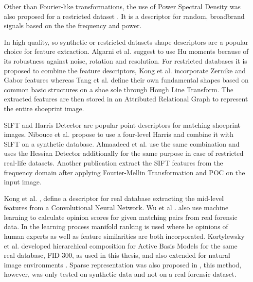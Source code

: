 \documentclass[draft,final]{vutinfth} %
\begin{document}
Other than Fourier-like transformations, the use of Power Spectral Density was also proposed for a restricted dataset \cite{dardi2009texture}.
It is a descriptor for random, broadbrand signals based on the the frequency and power.
\par
In high quality, so synthetic or restricted datasets shape descriptors are a popular choice for feature extraction.
Algarni et al. \cite{algarni2008novel} suggest to use Hu moments because of its robustness against noise, rotation and resolution.
For restricted databases it is proposed to combine the feature descriptors, Kong et al. \cite{kong2014novel} incorporate Zernike and Gabor features whereas Tang et al. \cite{tang2010footwear} define their own fundamental shapes based on common basic structures on a shoe sole through Hough Line Transform. 
The extracted features are then stored in an Attributed Relational Graph to represent the entire shoeprint image.
\par
SIFT and Harris Detector are popular point descriptors for matching shoeprint images.
Nibouce et al. \cite{nibouche2009rotation} propose to use a four-level Harris and combine it with SIFT on a synthetic database.
Almaadeed et al. \cite{almaadeed2015partial} use the same combination and uses the Hessian Detector additionally for the same purpose in case of restricted real-life datasets.
Another publication \cite{richetelli2017classification} extract the SIFT features from the frequency domain after applying Fourier-Mellin Transformation and POC on the input image.
\par
Kong et al. \cite{kong2017cross}, \cite{kong2019cross} define a descriptor for real database extracting the mid-level features from a Convolutional Neural Network.
Wu et al .\cite{wu2019losgsr} also use machine learning to calculate opinion scores for given matching pairs from real forensic data.
In the learning process manifold ranking is used where he opinions of human experts as well as feature similarities are both incorporated.
Kortylewsky et al. \cite{kortylewski2016probabilistic} developed hierarchical composition for Active Basis Models for the same real database, FID-300, as used in this thesis, and also extended for natural image environments \cite{kortylewski2019greedy}.
Sparse representation was also proposed in \cite{alizadeh2017automatic}, this method, however, was only tested on synthetic data and not on a real forensic dataset.
\end{document}
